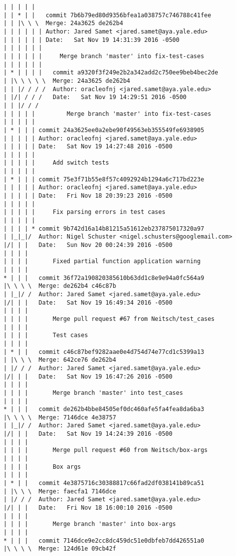 \begin{lstlisting}
| | | | |        
| | * | |   commit 7b6b79ed80d9356bfea1a038757c746788c41fee
| | |\ \ \  Merge: 24a3625 de262b4
| | | | | | Author: Jared Samet <jared.samet@aya.yale.edu>
| | | | | | Date:   Sat Nov 19 14:31:39 2016 -0500
| | | | | | 
| | | | | |     Merge branch 'master' into fix-test-cases
| | | | | |         
| * | | | |   commit a9320f3f249e2b2a342add2c750ee9beb4bec2de
| |\ \ \ \ \  Merge: 24a3625 de262b4
| | |/ / / /  Author: oracleofnj <jared.samet@aya.yale.edu>
| |/| / / /   Date:   Sat Nov 19 14:29:51 2016 -0500
| | |/ / /    
| | | | |         Merge branch 'master' into fix-test-cases
| | | | |      
| * | | | commit 24a3625ee0a2ebe90f49563eb355549fe6938905
| | | | | Author: oracleofnj <jared.samet@aya.yale.edu>
| | | | | Date:   Sat Nov 19 14:27:48 2016 -0500
| | | | | 
| | | | |     Add switch tests
| | | | |      
| * | | | commit 75e3f71b55e8f57c4092924b1294a6c717bd223e
| | | | | Author: oracleofnj <jared.samet@aya.yale.edu>
| | | | | Date:   Fri Nov 18 20:39:23 2016 -0500
| | | | | 
| | | | |     Fix parsing errors in test cases
| | | | |      
| | | | * commit 9b742d16a14b81215a51612eb237875017320a97
| |_|_|/  Author: Nigel Schuster <nigel.schusters@googlemail.com>
|/| | |   Date:   Sun Nov 20 00:24:39 2016 -0500
| | | |   
| | | |       Fixed partial function application warning
| | | |       
* | | |   commit 36f72a190820385610b63dd1c8e9e94a0fc564a9
|\ \ \ \  Merge: de262b4 c46c87b
| |_|/ /  Author: Jared Samet <jared.samet@aya.yale.edu>
|/| | |   Date:   Sat Nov 19 16:49:34 2016 -0500
| | | |   
| | | |       Merge pull request #67 from Neitsch/test_cases
| | | |       
| | | |       Test cases
| | | |       
| * | |   commit c46c87bef9282aae0e4d754d74e77cd1c5399a13
| |\ \ \  Merge: 642ce76 de262b4
| |/ / /  Author: Jared Samet <jared.samet@aya.yale.edu>
|/| | |   Date:   Sat Nov 19 16:47:26 2016 -0500
| | | |   
| | | |       Merge branch 'master' into test_cases
| | | |       
* | | |   commit de262b4bbe84505ef0dc460afe5fa4fea8da6ba3
|\ \ \ \  Merge: 7146dce 4e38757
| |_|/ /  Author: Jared Samet <jared.samet@aya.yale.edu>
|/| | |   Date:   Sat Nov 19 14:24:39 2016 -0500
| | | |   
| | | |       Merge pull request #60 from Neitsch/box-args
| | | |       
| | | |       Box args
| | | |       
| * | |   commit 4e3875716c30388817c66fad2df038141b89ca51
| |\ \ \  Merge: faecfa1 7146dce
| |/ / /  Author: Jared Samet <jared.samet@aya.yale.edu>
|/| | |   Date:   Fri Nov 18 16:00:10 2016 -0500
| | | |   
| | | |       Merge branch 'master' into box-args
| | | |       
* | | |   commit 7146dce9e2cc8dc459dc51e0dbfeb7dd426551a0
|\ \ \ \  Merge: 124d61e 09cb42f

\end{lstlisting}
